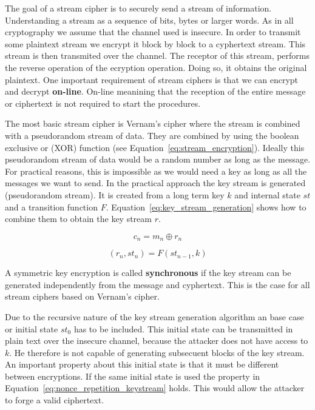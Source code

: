 The goal of a stream cipher is to securely send a stream of information.
Understanding a stream as a sequence of bits, bytes or larger words.
As in all cryptography we assume that the channel used is insecure.
In order to transmit some plaintext stream we encrypt it block by block to a cyphertext stream.
This stream is then transmited over the channel.
The receptor of this stream, performs the reverse operation of the ecryption operation.
Doing so, it obtains the original plaintext.
One important requirement of stream ciphers is that we can encrypt and decrypt \textbf{on-line}.
On-line meanining that the reception of the entire message or ciphertext is not required to start the procedures.

The most basic stream cipher is Vernam's cipher where the stream is combined with a pseudorandom stream of data.
They are combined by using the boolean exclusive or (XOR) function (see Equation~\ref{eq:stream_encryption}).
Ideally this pseudorandom stream of data would be a random number as long as the message.
For practical reasons, this is impossible as we would need a key as long as all the messages we want to send.
In the practical approach the key stream is generated (pseudorandom stream).
It is created from a long term key $k$ and internal state $st$ and a transition function $F$.
Equation~\ref{eq:key_stream_generation} shows how to combine them to obtain the key stream $r$.


\begin{equation}
c_n = m_n \oplus r_n
\label{eq:stream_encryption}
\end{equation}

\begin{equation}
(r_n, st_n) = F(st_{n-1}, k)
\label{eq:key_stream_generation}
\end{equation}

A symmetric key encryption is called \textbf{synchronous} if the key stream can be generated independently from the message and cyphertext.
This is the case for all stream ciphers based on Vernam's cipher.

Due to the recursive nature of the key stream generation algorithm an base case or initial state $st_0$ has to be included.
This initial state can be transmitted in plain text over the insecure channel, because the attacker does not have access to $k$.
He therefore is not capable of generating subsecuent blocks of the key stream.
An important property about this initial state is that it must be different between encryptions.
If the same initial state is used the property in Equation~\ref{eq:nonce_repetition_keystream} holds.
This would allow the attacker to forge a valid ciphertext.

